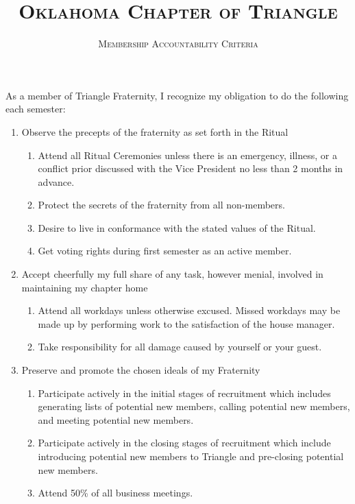 \documentclass{article}
\title{\textsc{Oklahoma Chapter of Triangle}}
\subtitle{\textsc{Membership Accountability Criteria}}
\begin{document}
\maketitle

\setlength\parindent{0pt}

As a member of Triangle Fraternity, I recognize my obligation to do the following each semester:

\begin{enumerate}
    \item Observe the precepts of the fraternity as set forth in the Ritual
    \begin{enumerate}
        \item Attend all Ritual Ceremonies unless there is an emergency, illness, or a conflict prior discussed with the Vice President no less than 2 months in advance.
        \item Protect the secrets of the fraternity from all non-members.
        \item Desire to live in conformance with the stated values of the Ritual.
        \item Get voting rights during first semester as an active member.
    \end{enumerate}
    \item Accept cheerfully my full share of any task, however menial, involved in maintaining my chapter home
    \begin{enumerate}
        \item Attend all workdays unless otherwise excused. Missed workdays may be made up by performing work to the satisfaction of the house manager.
        \item Take responsibility for all damage caused by yourself or your guest.
    \end{enumerate}
    \item Preserve and promote the chosen ideals of my Fraternity
    \begin{enumerate}
        \item Participate actively in the initial stages of recruitment which includes generating lists of potential new members, calling potential new members, and meeting potential new members.
        \item Participate actively in the closing stages of recruitment which include introducing potential new members to Triangle and pre-closing potential new members.
        \item Attend 50\% of all business meetings.
    \end{enumerate}

\end{enumerate}
\end{document}
